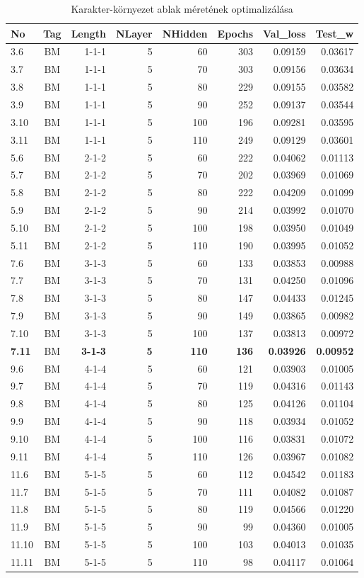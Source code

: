 \documentclass[a4paper, magyar]{article}
\begin{document}
\begin{small}
\begin{table}[tp]\centering
\begin{tabular}{|l|c|r|r|r|r|r|r|}
			\hline
			No&Tag&Length&NLayer&NHidden&Epochs&Val\_loss&Test\_w\\
\hline\hline
3.6&BM&1-1-1&5&60&303&0.09159&0.03617\\
\hline
3.7&BM&1-1-1&5&70&303&0.09156&0.03634\\
\hline
3.8&BM&1-1-1&5&80&229&0.09155&0.03582\\
\hline
3.9&BM&1-1-1&5&90&252&0.09137&0.03544\\
\hline
3.10&BM&1-1-1&5&100&196&0.09281&0.03595\\
\hline
3.11&BM&1-1-1&5&110&249&0.09129&0.03601\\
\hline
5.6&BM&2-1-2&5&60&222&0.04062&0.01113\\
\hline
5.7&BM&2-1-2&5&70&202&0.03969&0.01069\\
\hline
5.8&BM&2-1-2&5&80&222&0.04209&0.01099\\
\hline
5.9&BM&2-1-2&5&90&214&0.03992&0.01070\\
\hline
5.10&BM&2-1-2&5&100&198&0.03950&0.01049\\
\hline
5.11&BM&2-1-2&5&110&190&0.03995&0.01052\\
\hline
7.6&BM&3-1-3&5&60&133&0.03853&0.00988\\
\hline
7.7&BM&3-1-3&5&70&131&0.04250&0.01096\\
\hline
7.8&BM&3-1-3&5&80&147&0.04433&0.01245\\
\hline
7.9&BM&3-1-3&5&90&149&0.03865&0.00982\\
\hline
7.10&BM&3-1-3&5&100&137&0.03813&0.00972\\
\hline
\textbf{7.11}&BM&\textbf{3-1-3}&\textbf{5}&\textbf{110}&\textbf{136}&\textbf{0.03926}&\textbf{0.00952}\\
\hline
9.6&BM&4-1-4&5&60&121&0.03903&0.01005\\
\hline
9.7&BM&4-1-4&5&70&119&0.04316&0.01143\\
\hline
9.8&BM&4-1-4&5&80&125&0.04126&0.01104\\
\hline
9.9&BM&4-1-4&5&90&118&0.03934&0.01052\\
\hline
9.10&BM&4-1-4&5&100&116&0.03831&0.01072\\
\hline
9.11&BM&4-1-4&5&110&126&0.03967&0.01082\\
\hline
11.6&BM&5-1-5&5&60&112&0.04542&0.01183\\
\hline
11.7&BM&5-1-5&5&70&111&0.04082&0.01087\\
\hline
11.8&BM&5-1-5&5&80&119&0.04566&0.01220\\
\hline
11.9&BM&5-1-5&5&90&99&0.04360&0.01005\\
\hline
11.10&BM&5-1-5&5&100&103&0.04013&0.01035\\
\hline
11.11&BM&5-1-5&5&110&98&0.04117&0.01064\\
\hline
\end{tabular}
\caption{Karakter-környezet ablak méretének optimalizálása}
\label{tab:winoptim}
\end{table}
\end{small}
\end{document}
